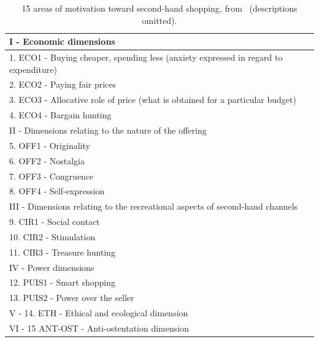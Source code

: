 \begin{table}[!tbp]
	\begin{tabular}{p{}}
		\toprule
		I - Economic dimensions                                                              \\\midrule
		1. ECO1 - Buying cheaper, spending less (anxiety expressed in regard to expenditure) \\
		2. ECO2 - Paying fair prices                                                         \\
		3. ECO3 - Allocative role of price (what is obtained for a particular budget)        \\
		4. ECO4 - Bargain hunting                                                            \\
		\toprule
		II - Dimensions relating to the nature of the offering                               \\\midrule
		5. OFF1 - Originality                                                                \\
		6. OFF2 - Nostalgia                                                                  \\
		7. OFF3 - Congruence                                                                 \\
		8. OFF4 - Self-expression                                                            \\
		\toprule
		III - Dimensions relating to the recreational aspects of second-hand channels        \\\midrule
		9. CIR1 - Social contact                                                             \\
		10. CIR2 - Stimulation                                                               \\
		11. CIR3 - Treasure hunting                                                          \\
		\toprule
		IV - Power dimensions                                                                \\\midrule
		12. PUIS1 - Smart shopping                                                           \\
		13. PUIS2 - Power over the seller                                                    \\
		\toprule
		V - 14. ETH - Ethical and ecological dimension                                       \\
		\toprule
		VI - 15 ANT-OST - Anti-ostentation dimension                                         \\
		\bottomrule
	\end{tabular}\\
	\caption{15 areas of motivation toward second-hand shopping, from~\cite{SecondHandMotives} (descriptions omitted).}\label{tab:SecondHandMotives}
\end{table}

